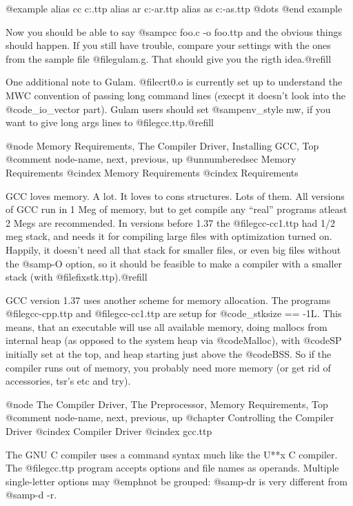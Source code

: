 {@example
alias cc c:\gnu\bin\gcc.ttp
alias ar c:\gnu\bin\gcc-ar.ttp
alias as c:\gnu\bin\gcc-as.ttp
@dots{}
@end example

Now you should be able to say @samp{cc foo.c -o foo.ttp} and the obvious
things should happen. If you still have trouble, compare your settings
with the ones from the sample file @file{gulam.g}. That should give you
the rigth idea.@refill

One additional note to Gulam. @file{crt0.o} is currently set up to
understand the MWC convention of passing long command lines (execpt it
doesn't look into the @code{_io_vector} part). Gulam users should set
@samp{env_style mw}, if you want to give long args lines to
@file{gcc.ttp}.@refill

@node     Memory Requirements, The Compiler Driver, Installing GCC, Top
@comment  node-name,           next,                previous,       up
@unnumberedsec Memory Requirements
@cindex Memory Requirements
@cindex Requirements

GCC loves memory. A lot. It loves to cons structures. Lots of them.
All versions of GCC run in 1 Meg of memory, but to get compile any ``real''
programs atleast 2 Megs  are recommended. In versions before 1.37
the @file{gcc-cc1.ttp} had
1/2 meg stack, and needs it for compiling large files with optimization
turned on. Happily, it doesn't need all that stack for smaller files,
or even big files without the @samp{-O} option, so it should be feasible
to make a compiler with a smaller stack (with @file{fixstk.ttp}).@refill

GCC version 1.37 uses another scheme for memory allocation. The programs
@file{gcc-cpp.ttp} and @file{gcc-cc1.ttp} are setup for 
@code{_stksize == -1L}. This means, that an executable will use all 
available memory, doing mallocs from internal heap (as opposed to the
system heap via @code{Malloc}), with @code{SP} initially set at the top,
and heap starting just above the @code{BSS}. So if the compiler runs out
of memory, you probably need more memory (or get rid of accessories,
tsr's etc and try).

@node     The Compiler Driver, The Preprocessor, Memory Requirements, Top
@comment  node-name,           next,             previous,            up
@chapter Controlling the Compiler Driver
@cindex Compiler Driver
@cindex gcc.ttp

The GNU C compiler uses a command syntax much like the U**x C compiler.
The @file{gcc.ttp} program accepts options and file names as operands.
Multiple single-letter options may @emph{not} be grouped: @samp{-dr} is
very different from @samp{-d -r}.

}
